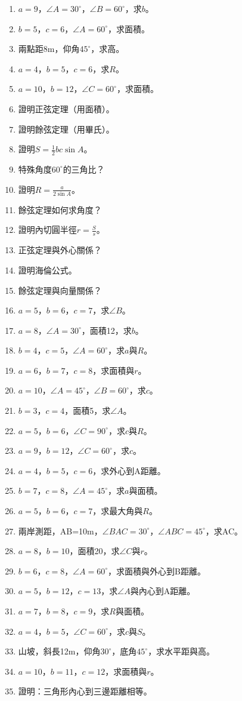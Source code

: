 \begin{enumerate}[label=\arabic*.]
    \item $a=9$，$\angle A=30^\circ$，$\angle B=60^\circ$，求$b$。
    \item $b=5$，$c=6$，$\angle A=60^\circ$，求面積。
    \item 兩點距8m，仰角$45^\circ$，求高。
    \item $a=4$，$b=5$，$c=6$，求$R$。
    \item $a=10$，$b=12$，$\angle C=60^\circ$，求面積。
    \item 證明正弦定理（用面積）。
    \item 證明餘弦定理（用畢氏）。
    \item 證明$S = \frac{1}{2}bc \sin A$。
    \item 特殊角度$60^\circ$的三角比？
    \item 證明$R = \frac{a}{2 \sin A}$。
    \item 餘弦定理如何求角度？
    \item 證明內切圓半徑$r = \frac{S}{s}$。
    \item 正弦定理與外心關係？
    \item 證明海倫公式。
    \item 餘弦定理與向量關係？
    \item $a=5$，$b=6$，$c=7$，求$\angle B$。
    \item $a=8$，$\angle A=30^\circ$，面積12，求$b$。
    \item $b=4$，$c=5$，$\angle A=60^\circ$，求$a$與$R$。
    \item $a=6$，$b=7$，$c=8$，求面積與$r$。
    \item $a=10$，$\angle A=45^\circ$，$\angle B=60^\circ$，求$c$。
    \item $b=3$，$c=4$，面積5，求$\angle A$。
    \item $a=5$，$b=6$，$\angle C=90^\circ$，求$c$與$R$。
    \item $a=9$，$b=12$，$\angle C=60^\circ$，求$c$。
    \item $a=4$，$b=5$，$c=6$，求外心到A距離。
    \item $b=7$，$c=8$，$\angle A=45^\circ$，求$a$與面積。
    \item $a=5$，$b=6$，$c=7$，求最大角與$R$。
    \item 兩岸測距，AB=10m，$\angle BAC=30^\circ$，$\angle ABC=45^\circ$，求AC。
    \item $a=8$，$b=10$，面積20，求$\angle C$與$r$。
    \item $b=6$，$c=8$，$\angle A=60^\circ$，求面積與外心到B距離。
    \item $a=5$，$b=12$，$c=13$，求$\angle A$與內心到A距離。
    \item $a=7$，$b=8$，$c=9$，求$R$與面積。
    \item $a=4$，$b=5$，$\angle C=60^\circ$，求$c$與$S$。
    \item 山坡，斜長12m，仰角$30^\circ$，底角$45^\circ$，求水平距與高。
    \item $a=10$，$b=11$，$c=12$，求面積與$r$。
    \item 證明：三角形內心到三邊距離相等。
\end{enumerate}